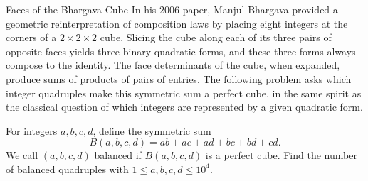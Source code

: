 \begin{problem}{Faces of the Bhargava Cube}
    In his 2006 paper, Manjul Bhargava provided a geometric reinterpretation of composition laws by placing eight integers at the corners of a \(2\times2\times2\) cube. Slicing the cube along each of its three pairs of opposite faces yields three binary quadratic forms, and these three forms always compose to the identity. The face determinants of the cube, when expanded, produce sums of products of pairs of entries. The following problem asks which integer quadruples make this symmetric sum a perfect cube, in the same spirit as the classical question of which integers are represented by a given quadratic form.

    For integers \(a, b, c, d\), define the symmetric sum
    \[
    B(a,b,c,d) = ab + ac + ad + bc + bd + cd.
    \]
    We call \((a,b,c,d)\) balanced if \(B(a,b,c,d)\) is a perfect cube.
    Find the number of balanced quadruples with \(1 \leq a, b, c, d \leq 10^4\).

    
\end{problem}
